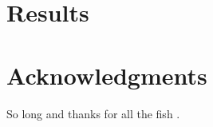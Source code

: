 \documentclass[fleqn,10pt]{article} %
\begin{document}
\section{Results}

\section*{Acknowledgments} %


So long and thanks for all the fish \cite{Figueredo:2009dg}.




\end{document}

